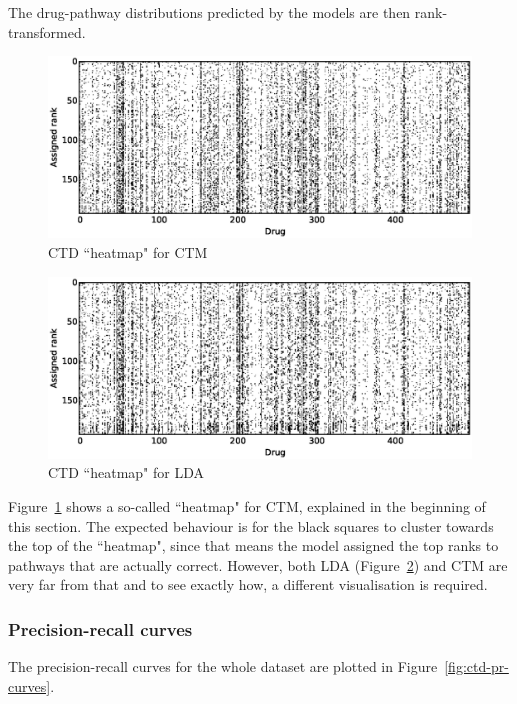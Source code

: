 \documentclass[12pt,a4paper,twoside,openright]{report}
\begin{document}
The drug-pathway distributions predicted by the models are then rank-transformed.

\begin{figure}[!htb]
\includegraphics[width=\textwidth]{ctm-ctd-heatmap.eps}
\caption{CTD ``heatmap" for CTM}
\label{fig:ctm-ctd-heatmap}
\end{figure}

\begin{figure}[!htb]
\includegraphics[width=\textwidth]{lda-ctd-heatmap.eps}
\caption{CTD ``heatmap" for LDA}
\label{fig:lda-ctd-heatmap}
\end{figure}

Figure~\ref{fig:ctm-ctd-heatmap} shows a so-called ``heatmap" for CTM, explained in the beginning of this section. The expected behaviour is for the black squares to cluster towards the top of the ``heatmap", since that means the model assigned the top ranks to pathways that are actually correct. However, both LDA (Figure~\ref{fig:lda-ctd-heatmap}) and CTM are very far from that and to see exactly how, a different visualisation is required.


\subsubsection{Precision-recall curves}

The precision-recall curves for the whole dataset are plotted in Figure~\ref{fig:ctd-pr-curves}.
\end{document}
